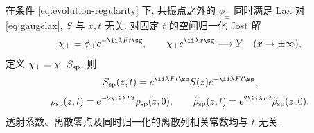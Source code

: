 \begin{proposition}[散射数据的时间演化]\label{prop:evolution}
在条件 \eqref{eq:evolution-regularity} 下, 共振点之外的 $\phi_\pm$ 同时满足 Lax 对 \eqref{eq:gaugelax}, $S$ 与 $x,t$ 无关. 对固定 $t$ 的空间归一化 Jost 解
\[
\chi_\pm=\phi_\pm e^{-\ii\lambda Ft\sg},\qquad
\chi_\pm e^{\ii\lambda x\sg}\longrightarrow Y\quad(x\to\pm\infty),
\]
定义 $\chi_+=\chi_-S_{\rm sp}$. 则
\begin{equation}\label{eq:timeS}
S_{\rm sp}(z,t)=e^{\ii\lambda Ft\sg}S(z)e^{-\ii\lambda Ft\sg},
\end{equation}
\begin{equation}\label{eq:timer}
\rho_{\rm sp}(z,t)=e^{-2\ii\lambda Ft}\rho_{\rm sp}(z,0),\qquad
\widetilde\rho_{\rm sp}(z,t)=e^{2\ii\lambda Ft}\widetilde\rho_{\rm sp}(z,0).
\end{equation}
透射系数、离散零点及同时归一化的离散列相关常数均与 $t$ 无关.
\end{proposition}
